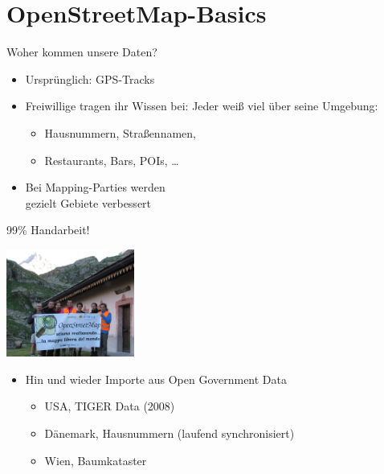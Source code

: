 \documentclass{beamer}
\begin{document}
\section{OpenStreetMap-Basics}

\begin{frame}{Woher kommen unsere Daten?}

\begin{itemize}
  \item Ursprünglich: GPS-Tracks
  \item Freiwillige tragen ihr Wissen bei: Jeder weiß viel über seine Umgebung:
        \begin{itemize}
          \item Hausnummern, Straßennamen,
          \item Restaurants, Bars, POIs, \dots
  \end{itemize}
  \pause
  \item Bei Mapping-Parties werden \\ gezielt Gebiete verbessert
\end{itemize}

  \vspace{0.4cm}
 99\% Handarbeit!

  \vspace*{-2.9cm}
 \hfill \includegraphics[width=4.2cm]{alps_mp.jpg}


  \pause
\begin{itemize}
  \item Hin und wieder Importe aus Open Government Data
  \begin{itemize}
    \item USA, TIGER Data (2008)
    \item Dänemark, Hausnummern (laufend synchronisiert)
    \item Wien, Baumkataster
  \end{itemize}
\end{itemize}

\end{frame}
\end{document}
